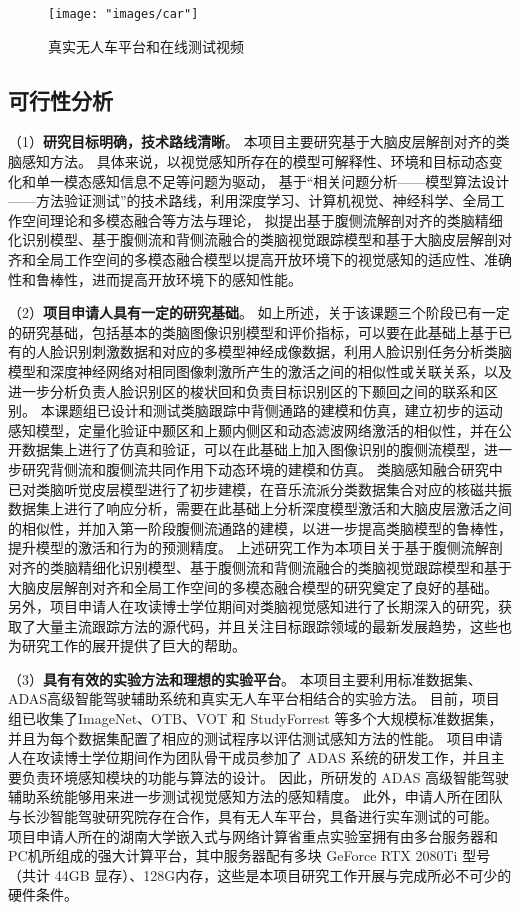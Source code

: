\documentclass[a4paper,zihao=-4]{article}
\begin{document}
\begin{figure*}[htb!]
	\centering  
	{\texttt{[image: "images/car"]}
	}
	\caption{真实无人车平台和在线测试视频}
	\label{fig:car}
\end{figure*}


\textcolor{NsfcBlue}{\subsection{可行性分析}}
（1）\textbf{研究目标明确，技术路线清晰}。
本项目主要研究基于大脑皮层解剖对齐的类脑感知方法。
具体来说，以视觉感知所存在的模型可解释性、环境和目标动态变化和单一模态感知信息不足等问题为驱动，
基于“相关问题分析——模型算法设计——方法验证测试”的技术路线，利用深度学习、计算机视觉、神经科学、全局工作空间理论和多模态融合等方法与理论，
拟提出基于腹侧流解剖对齐的类脑精细化识别模型、基于腹侧流和背侧流融合的类脑视觉跟踪模型和基于大脑皮层解剖对齐和全局工作空间的多模态融合模型以提高开放环境下的视觉感知的适应性、准确性和鲁棒性，进而提高开放环境下的感知性能。

（2）\textbf{项目申请人具有一定的研究基础}。
如上所述，关于该课题三个阶段已有一定的研究基础，包括基本的类脑图像识别模型和评价指标，可以要在此基础上基于已有的人脸识别刺激数据和对应的多模型神经成像数据，利用人脸识别任务分析类脑模型和深度神经网络对相同图像刺激所产生的激活之间的相似性或关联关系，以及进一步分析负责人脸识别区的梭状回和负责目标识别区的下颞回之间的联系和区别。
本课题组已设计和测试类脑跟踪中背侧通路的建模和仿真，建立初步的运动感知模型，定量化验证中颞区和上颞内侧区和动态滤波网络激活的相似性，并在公开数据集上进行了仿真和验证，可以在此基础上加入图像识别的腹侧流模型，进一步研究背侧流和腹侧流共同作用下动态环境的建模和仿真。
类脑感知融合研究中已对类脑听觉皮层模型进行了初步建模，在音乐流派分类数据集合对应的核磁共振数据集上进行了响应分析，需要在此基础上分析深度模型激活和大脑皮层激活之间的相似性，并加入第一阶段腹侧流通路的建模，以进一步提高类脑模型的鲁棒性，提升模型的激活和行为的预测精度。
%
上述研究工作为本项目关于基于腹侧流解剖对齐的类脑精细化识别模型、基于腹侧流和背侧流融合的类脑视觉跟踪模型和基于大脑皮层解剖对齐和全局工作空间的多模态融合模型的研究奠定了良好的基础。
另外，项目申请人在攻读博士学位期间对类脑视觉感知进行了长期深入的研究，获取了大量主流跟踪方法的源代码，并且关注目标跟踪领域的最新发展趋势，这些也为研究工作的展开提供了巨大的帮助。

（3）\textbf{具有有效的实验方法和理想的实验平台}。
本项目主要利用标准数据集、ADAS高级智能驾驶辅助系统和真实无人车平台相结合的实验方法。
目前，项目组已收集了ImageNet、OTB、VOT 和 StudyForrest 等多个大规模标准数据集，并且为每个数据集配置了相应的测试程序以评估测试感知方法的性能。
项目申请人在攻读博士学位期间作为团队骨干成员参加了 ADAS 系统的研发工作，并且主要负责环境感知模块的功能与算法的设计。
因此，所研发的 ADAS 高级智能驾驶辅助系统能够用来进一步测试视觉感知方法的感知精度。
此外，申请人所在团队与长沙智能驾驶研究院存在合作，具有无人车平台，具备进行实车测试的可能。
项目申请人所在的湖南大学嵌入式与网络计算省重点实验室拥有由多台服务器和PC机所组成的强大计算平台，其中服务器配有多块 GeForce RTX 2080Ti 型号（共计 44GB 显存）、128G内存，这些是本项目研究工作开展与完成所必不可少的硬件条件。
\end{document}
